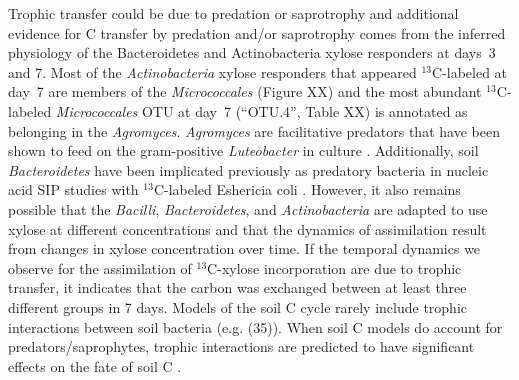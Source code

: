 Trophic transfer could be due to predation or saprotrophy and additional
evidence for C transfer by predation and/or saprotrophy comes from the
inferred physiology of the Bacteroidetes and Actinobacteria xylose responders
at days~3 and 7. Most of the \textit{Actinobacteria} xylose responders that
appeared $^{13}$C-labeled at day~7 are members of the \textit{Micrococcales} (Figure
XX) and the most abundant $^{13}$C-labeled \textit{Micrococcales} OTU at day~7
(“OTU.4”, Table XX) is annotated as belonging in the \textit{Agromyces}.
\textit{Agromyces} are facilitative predators that have been shown to feed on
the gram-positive \textit{Luteobacter} in culture \citep{16346402}.
Additionally, soil \textit{Bacteroidetes} have been implicated previously as
predatory bacteria in nucleic acid SIP studies with $^{13}$C-labeled
Eshericia coli \citep{Lueders2006}. However, it also
remains possible that the \textit{Bacilli}, \textit{Bacteroidetes}, and
\textit{Actinobacteria} are adapted to use xylose at different
concentrations and that the dynamics of assimilation result from changes
in xylose concentration over time. If the temporal dynamics we observe for
the assimilation of $^{13}$C-xylose incorporation are due to trophic
transfer, it indicates that the carbon was exchanged between at least
three different groups in 7 days. Models of the soil C cycle rarely
include trophic interactions between soil bacteria (e.g. \citep{}(35)).
When soil C models do account for predators/saprophytes, trophic
interactions are predicted to have significant effects on the fate of soil
C \citep{Kaiser2014a}. 

